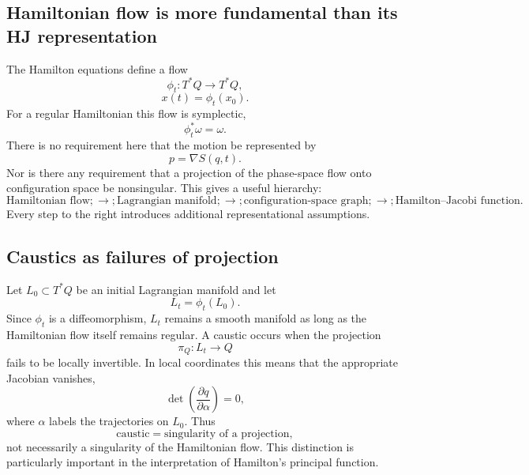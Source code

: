 \subsection{Hamiltonian flow is more fundamental than its HJ representation}
The Hamilton equations define a flow
\begin{equation}
\phi_t:T^*Q\longrightarrow T^*Q,
\end{equation}
\begin{equation}
x(t)=\phi_t(x_0).
\end{equation}
For a regular Hamiltonian this flow is symplectic,
\begin{equation}
\phi_t^*\omega=\omega.
\end{equation}
There is no requirement here that the motion be represented by
\begin{equation}
p=\nabla S(q,t).
\end{equation}
Nor is there any requirement that a projection of the phase-space flow onto
configuration space be nonsingular.
This gives a useful hierarchy:
\begin{equation}
\boxed{
\text{Hamiltonian flow}
;\longrightarrow;
\text{Lagrangian manifold}
;\longrightarrow;
\text{configuration-space graph}
;\longrightarrow;
\text{Hamilton--Jacobi function}.
}
\label{hierarchy}
\end{equation}
Every step to the right introduces additional representational assumptions.
\subsection{Caustics as failures of projection}
Let \(L_0\subset T^*Q\) be an initial Lagrangian manifold and let
\begin{equation}
L_t=\phi_t(L_0).
\end{equation}
Since \(\phi_t\) is a diffeomorphism, \(L_t\) remains a smooth manifold as long
as the Hamiltonian flow itself remains regular.
A caustic occurs when the projection
\begin{equation}
\pi_Q:L_t\longrightarrow Q
\end{equation}
fails to be locally invertible.  In local coordinates this means that the
appropriate Jacobian vanishes,
\begin{equation}
\det\left(
\frac{\partial q}{\partial\alpha}
\right)=0,
\label{projectioncaustic}
\end{equation}
where \(\alpha\) labels the trajectories on \(L_0\).
Thus
\begin{equation}
\boxed{
\text{caustic}=\text{singularity of a projection},
}
\end{equation}
not necessarily a singularity of the Hamiltonian flow.
This distinction is particularly important in the interpretation of
Hamilton's principal function.
